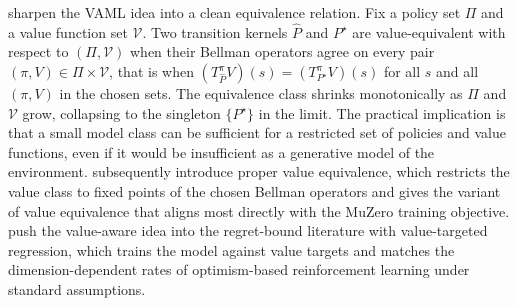 \citet{GrimmVALEQ2020} sharpen the VAML idea into a clean equivalence relation. Fix a policy set $\Pi$ and a value function set $\mathcal{V}$. Two transition kernels $\widehat P$ and $P^\star$ are value-equivalent with respect to $(\Pi, \mathcal{V})$ when their Bellman operators agree on every pair $(\pi, V) \in \Pi \times \mathcal{V}$, that is when $(T^\pi_{\widehat P} V)(s) = (T^\pi_{P^\star} V)(s)$ for all $s$ and all $(\pi, V)$ in the chosen sets. The equivalence class shrinks monotonically as $\Pi$ and $\mathcal{V}$ grow, collapsing to the singleton $\{P^\star\}$ in the limit. The practical implication is that a small model class can be sufficient for a restricted set of policies and value functions, even if it would be insufficient as a generative model of the environment. \citet{GrimmPVE2021} subsequently introduce proper value equivalence, which restricts the value class to fixed points of the chosen Bellman operators and gives the variant of value equivalence that aligns most directly with the MuZero training objective. \citet{AyoubVTR2020} push the value-aware idea into the regret-bound literature with value-targeted regression, which trains the model against value targets and matches the dimension-dependent rates of optimism-based reinforcement learning under standard assumptions.

